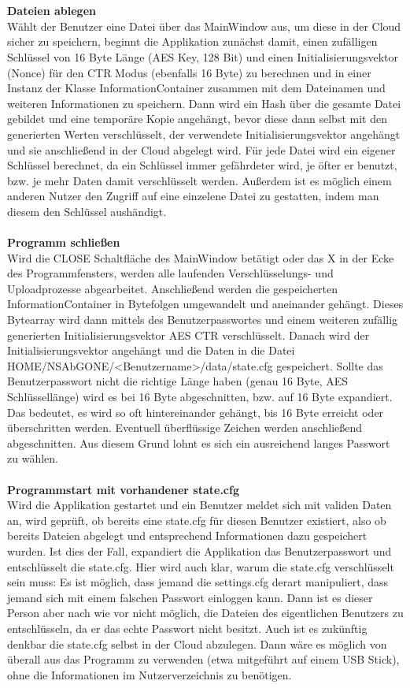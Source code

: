 \documentclass[12pt,a4paper,bibliography=totocnumbered,listof=totocnumbered]{scrartcl}
\begin{document}
\\\\\textbf{Dateien ablegen}\\
Wählt der Benutzer eine Datei über das MainWindow aus, um diese in der Cloud sicher zu speichern, beginnt die Applikation zunächst damit, einen zufälligen Schlüssel von 16 Byte Länge (AES Key, 128 Bit) und einen Initialisierungsvektor (Nonce) für den CTR Modus (ebenfalls 16 Byte) zu berechnen und in einer Instanz der Klasse InformationContainer zusammen mit dem Dateinamen und weiteren Informationen zu speichern. Dann wird ein Hash über die gesamte Datei gebildet und eine temporäre Kopie angehängt, bevor diese dann selbst mit den generierten Werten verschlüsselt, der verwendete Initialisierungsvektor angehängt und sie anschließend in der Cloud abgelegt wird. Für jede Datei wird ein eigener Schlüssel berechnet, da ein Schlüssel immer gefährdeter wird, je öfter er benutzt, bzw. je mehr Daten damit verschlüsselt werden. Außerdem ist es möglich einem anderen Nutzer den Zugriff auf eine einzelene Datei zu gestatten, indem man diesem den Schlüssel aushändigt. 
\\\\\textbf{Programm schließen}\\
Wird die CLOSE Schaltfläche des MainWindow betätigt oder das X in der Ecke des Programmfensters, werden alle laufenden Verschlüsselungs- und Uploadprozesse abgearbeitet. Anschließend werden die gespeicherten InformationContainer in Bytefolgen umgewandelt und aneinander gehängt. Dieses Bytearray wird dann mittels des Benutzerpasswortes und einem weiteren zufällig generierten Initialisierungsvektor AES CTR verschlüsselt. Danach wird der Initialisierungsvektor angehängt und die Daten in die Datei HOME/NSAbGONE/\textless Benutzername\textgreater/data/state.cfg gespeichert. Sollte das Benutzerpasswort nicht die richtige Länge haben (genau 16 Byte, AES Schlüssellänge) wird es bei 16 Byte abgeschnitten, bzw. auf 16 Byte expandiert. Das bedeutet, es wird so oft hintereinander gehängt, bis 16 Byte erreicht oder überschritten werden. Eventuell überflüssige Zeichen werden anschließend abgeschnitten. Aus diesem Grund lohnt es sich ein ausreichend langes Passwort zu wählen.
\\\\\textbf{Programmstart mit vorhandener state.cfg}\\
Wird die Applikation gestartet und ein Benutzer meldet sich mit validen Daten an, wird geprüft, ob bereits eine state.cfg für diesen Benutzer existiert, also ob bereits Dateien abgelegt und entsprechend Informationen dazu gespeichert wurden. Ist dies der Fall, expandiert die Applikation das Benutzerpasswort und entschlüsselt die state.cfg. Hier wird auch klar, warum die state.cfg verschlüsselt sein muss: Es ist möglich, dass jemand die settings.cfg derart manipuliert, dass jemand sich mit einem falschen Passwort einloggen kann. Dann ist es dieser Person aber nach wie vor nicht möglich, die Dateien des eigentlichen Benutzers zu entschlüsseln, da er das echte Passwort nicht besitzt. Auch ist es zukünftig denkbar die state.cfg selbst in der Cloud abzulegen. Dann wäre es möglich von überall aus das Programm zu verwenden (etwa mitgeführt auf einem USB Stick), ohne die Informationen im Nutzerverzeichnis zu benötigen.
\end{document}
